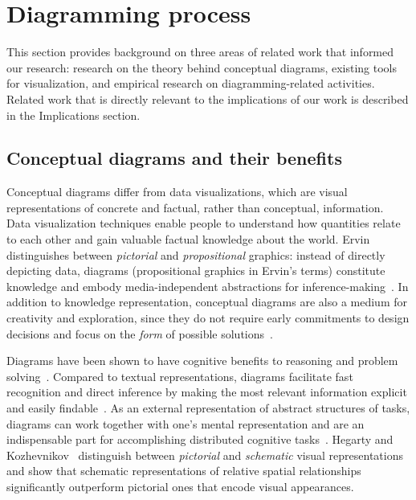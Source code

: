\section{Diagramming process}

This section provides background on three areas of related work that informed our research: research on the theory behind conceptual diagrams, existing tools for visualization, and empirical research on diagramming-related activities. Related work that is directly relevant to the implications of our work is described in the Implications section. 

\subsection{Conceptual diagrams and their benefits}

Conceptual diagrams differ from data visualizations, which are visual representations of concrete and factual, rather than conceptual, information. Data visualization techniques enable people to understand how quantities relate to each other and gain valuable factual knowledge about the world. Ervin~\cite{designWithDiagrams} distinguishes between \emph{pictorial} and \emph{propositional} graphics: instead of directly depicting data, diagrams (propositional graphics in Ervin's terms) constitute knowledge and embody media-independent abstractions for inference-making~\cite{DiagramsThousandWords}. In addition to knowledge representation, conceptual diagrams are also a medium for creativity and exploration, since they do not require early commitments to design decisions and focus on the \emph{form} of possible solutions~\cite{ConceptualArchDesign}.

Diagrams have been shown to have cognitive benefits to reasoning and problem solving~\cite{DiagramsThousandWords, emergentProperties, multimediaPrinciple}. Compared to textual representations, diagrams facilitate fast recognition and direct inference by making the most relevant information explicit and easily findable~\cite{DiagramsThousandWords}. As an external representation of abstract structures of tasks, diagrams can work together with one's mental representation and are an indispensable part for accomplishing distributed cognitive tasks~\cite{DistributedCognitive}. Hegarty and Kozhevnikov~\cite{visualSpatialProblemSolving} distinguish between \emph{pictorial} and \emph{schematic} visual representations and show that schematic representations of relative spatial relationships significantly outperform pictorial ones that encode visual appearances.

